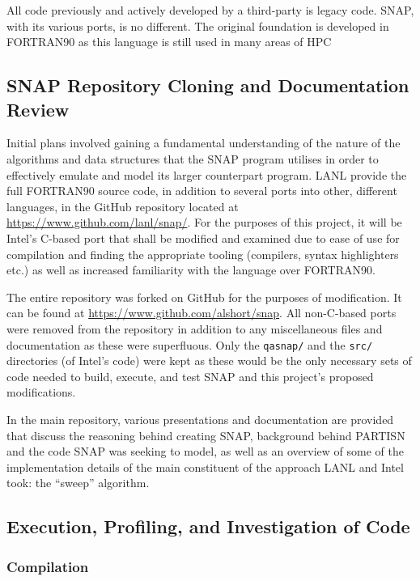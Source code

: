 \documentclass[conference]{IEEEtran}
\begin{document}
All code previously and actively developed by a third-party is legacy code. SNAP, with its various ports, is no different. The original foundation is developed in FORTRAN90 as this language is still used in many areas of HPC 

\subsection{SNAP Repository Cloning and Documentation Review}

Initial plans involved gaining a fundamental understanding of the nature of the algorithms and data structures that the SNAP program utilises in order to effectively emulate and model its larger counterpart program. LANL provide the full FORTRAN90 source code, in addition to several ports into other, different languages, in the GitHub repository located at \url{https://www.github.com/lanl/snap/}. For the purposes of this project, it will be Intel's C-based port that shall be modified and examined due to ease of use for compilation and finding the appropriate tooling (compilers, syntax highlighters etc.) as well as increased familiarity with the language over FORTRAN90.

The entire repository was forked on GitHub for the purposes of modification. It can be found at \url{https://www.github.com/alshort/snap}. All non-C-based ports were removed from the repository in addition to any miscellaneous files and documentation as these were superfluous. Only the \texttt{qasnap/} and the \texttt{src/} directories (of Intel's code) were kept as these would be the only necessary sets of code needed to build, execute, and test SNAP and this project's proposed modifications.

In the main repository, various presentations and documentation are provided that discuss the reasoning behind creating SNAP, background behind PARTISN and the code SNAP was seeking to model, as well as an overview of some of the implementation details of the main constituent of the approach LANL and Intel took: the ``sweep'' algorithm.

\subsection{Execution, Profiling, and Investigation of Code}

\subsubsection{Compilation}
\label{subsubsec:inv_compilation}
\end{document}
